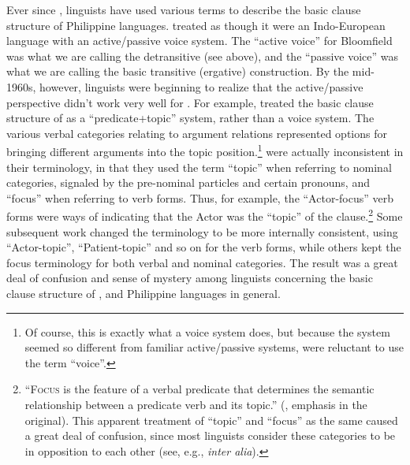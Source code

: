 Ever since \citet{blake1906}, linguists have used various terms to describe the basic clause structure of Philippine languages. \citet{bloomfield1917} treated  as though it were an Indo-European language with an active/passive voice system. The “active voice” for Bloomfield was what we are calling the detransitive (see above), and the “passive voice” was what we are calling the basic transitive (ergative) construction. By the mid-1960s, however, linguists were beginning to realize that the active/passive perspective didn’t work very well for . For example, \citet{schachter1972} treated the basic clause structure of  as a “predicate+topic” system, rather than a voice system. The various verbal categories relating to argument relations represented options for bringing different arguments into the topic position.\footnote{Of course, this is exactly what a voice system does, but because the  system seemed so different from familiar active/passive systems, \citet{schachter1972} were reluctant to use the term “voice”.} \citet{schachter1972} were actually inconsistent in their terminology, in that they used the term “topic” when referring to nominal categories, signaled by the pre-nominal particles and certain pronouns, and “focus” when referring to verb forms. Thus, for example, the “Actor-focus” verb forms were ways of indicating that the Actor was the “topic” of the clause.\footnote{“\textsc{Focus} is the feature of a verbal predicate that determines the semantic relationship between a predicate verb and its topic.” (\citealt[69]{schachter1972}, emphasis in the original). This apparent treatment of “topic” and “focus” as the same caused a great deal of confusion, since most linguists consider these categories to be in opposition to each other (see, e.g., \citealt{chafe1976, lyons1968} \textit{inter alia}).} Some subsequent work changed the terminology to be more internally consistent, using “Actor-topic”, “Patient-topic” and so on for the verb forms, while others kept the focus terminology for both verbal and nominal categories. The result was a great deal of confusion and sense of mystery among linguists concerning the basic clause structure of , and Philippine languages in general.

